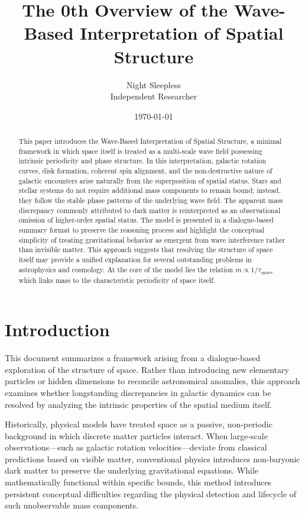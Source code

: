 \documentclass[12pt]{article}
\title{The 0th Overview of the Wave-Based Interpretation of Spatial Structure}
\author{Night Sleepless \\ Independent Researcher}
\date{\today}
\begin{document}
\maketitle

\begin{abstract}
This paper introduces the Wave-Based Interpretation of Spatial Structure, a minimal framework in which space itself is treated as a multi-scale wave field possessing intrinsic periodicity and phase structure. 
In this interpretation, galactic rotation curves, disk formation, coherent spin alignment, and the non-destructive nature of galactic encounters arise naturally from the superposition of spatial status. 
Stars and stellar systems do not require additional mass components to remain bound; instead, they follow the stable phase patterns of the underlying wave field. 
The apparent mass discrepancy commonly attributed to dark matter is reinterpreted as an observational omission of higher-order spatial status. The model is presented in a dialogue-based summary format to preserve the reasoning process and highlight the conceptual simplicity of treating gravitational behavior as emergent from wave interference rather than invisible matter. 
This approach suggests that resolving the structure of space itself may provide a unified explanation for several outstanding problems in astrophysics and cosmology.
At the core of the model lies the relation \( m \propto 1/\tau_{\text{space}} \) which links mass to the characteristic periodicity of space itself.
\end{abstract}

\section{Introduction}

This document summarizes a framework arising from a dialogue-based exploration of the structure of space. Rather than introducing new elementary particles or hidden dimensions to reconcile astronomical anomalies, this approach examines whether longstanding discrepancies in galactic dynamics can be resolved by analyzing the intrinsic properties of the spatial medium itself. 

Historically, physical models have treated space as a passive, non-periodic background in which discrete matter particles interact. When large-scale observations—such as galactic rotation velocities—deviate from classical predictions based on visible matter, conventional physics introduces non-baryonic dark matter to preserve the underlying gravitational equations. While mathematically functional within specific bounds, this method introduces persistent conceptual difficulties regarding the physical detection and lifecycle of such unobservable mass components.
\end{document}
